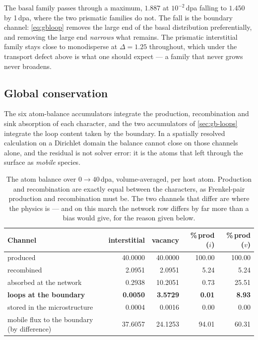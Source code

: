 The basal family passes through a maximum, $1.887$ at $10^{-2}\,$dpa falling to
$1.450$ by 1\,dpa, where the two prismatic families do not. The fall is the
boundary channel: \cref{eq:gbloop} removes the large end of the basal
distribution preferentially, and removing the large end \emph{narrows} what
remains. The prismatic interstitial family stays close to monodisperse at
$\Delta=1.25$ throughout, which under the transport defect above is what one
should expect --- a family that never grows never broadens.

\subsection{Global conservation}
\label{sec:results-conservation}

The six atom-balance accumulators integrate the production, recombination and
sink absorption of each character, and the two accumulators of
\cref{sec:gb-loops} integrate the loop content taken by the boundary. In a
spatially resolved calculation on a Dirichlet domain the balance cannot close on
those channels alone, and the residual is not solver error: it is the atoms that
left through the surface as \emph{mobile} species.

\begin{table}[htbp]
\caption{The atom balance over $0\to40\,$dpa, volume-averaged, per host atom.
Production and recombination are exactly equal between the characters, as
Frenkel-pair production and recombination must be. The two channels that differ
are where the physics is --- and on this march the network row differs by far
more than a bias would give, for the reason given below.}
\label{tab:conservation}
\centering
\begin{tabular}{@{}lrrrr@{}}
\toprule
Channel & interstitial & vacancy & \%\,prod ($i$) & \%\,prod ($v$) \\
\midrule
produced                  & 40.0000 & 40.0000 & 100.00 & 100.00 \\
recombined                &  2.0951 &  2.0951 &   5.24 &   5.24 \\
absorbed at the network   &  0.2938 & 10.2051 &   0.73 &  25.51 \\
\textbf{loops at the boundary} & \textbf{0.0050} & \textbf{3.5729}
                          & \textbf{0.01} & \textbf{8.93} \\
stored in the microstructure & 0.0004 & 0.0016 & 0.00 & 0.00 \\
\midrule
mobile flux to the boundary (by difference)
                          & 37.6057 & 24.1253 &  94.01 &  60.31 \\
\bottomrule
\end{tabular}
\end{table}

